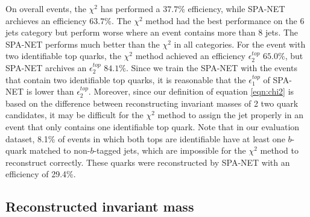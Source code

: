 On overall events, the $\chi^{2}$ has performed a $37.7\%$ efficiency, while SPA-NET archieves an efficiency $63.7\%$. The $\chi^{2}$ method had the best performance on the 6 jets category but perform worse where an event contains more than 8 jets. The SPA-NET performs much better than the $\chi^{2}$ in all categories. For the event with two identifiable top quarks, the $\chi^{2}$ method achieved an efficiency $\epsilon^{top}_{2}$ $65.0\%$, but SPA-NET archives an $\epsilon^{top}_{2}$ $84.1\%$. Since we train the SPA-NET with the events that contain two identifiable top quarks, it is reasonable that the $\epsilon^{top}_{1}$ of SPA-NET is lower than $\epsilon^{top}_{2}$. Moreover, since our definition of equation \ref{eqn:chi2} is based on the difference between reconstructing invariant masses of 2 two quark candidates, it may be difficult for the $\chi^{2}$ method to assign the jet properly in an event that only contains one identifiable top quark. Note that in our evaluation dataset, 8.1\% of events in which both tops are identifiable have at least one $b$-quark matched to non-$b$-tagged jets, which are impossible for the $\chi^{2}$ method to reconstruct correctly.  These quarks were reconstructed by SPA-NET with an efficiency of 29.4\%.

\subsection{Reconstructed invariant mass }\label{subsec:reco inv mass }

